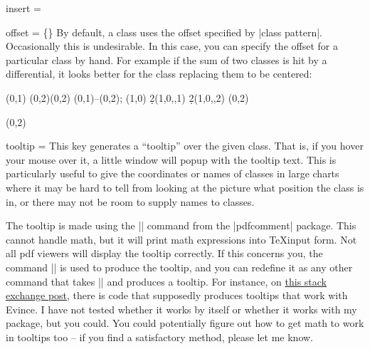 \begin{sseqdata}[|| name = ex1, cohomological Serre grading]
\begin{key}{insert = }
\end{key}

\begin{key}{offset = \{\}}
By default, a class uses the offset specified by |class pattern|. Occasionally this is undesirable. In this case, you can specify the offset for a particular class by hand. For example if the sum of two classes is hit by a differential, it looks better for the class replacing them to be centered:
\begin{codeexample}[width = 9cm]
\begin{sseqdata}[ name = offset example,
    xscale = 0.7,
    Adams grading,
    class placement transform = {scale = 1.8} ]
\class(0,1)
\class(0,2)\class(0,2)
\draw(0,1)--(0,2);
\class(1,0)
\d2(1,0,,1)
\d2(1,0,,2)
\replaceclass(0,2)
\end{sseqdata}
\printpage[name = offset example, page=2]
\printpage[name = offset example, page=3]
\begin{sseqpage}[name = offset example, page=3]
\classoptions[offset = {(0,0)}](0,2)
\end{sseqpage}
\end{codeexample}
\end{key}

\begin{key}{tooltip = }
This key generates a ``tooltip'' over the given class. That is, if you hover your mouse over it, a little window will popup with the tooltip text. This is particularly useful to give the coordinates or names of classes in large charts where it may be hard to tell from looking at the picture what position the class is in, or there may not be room to supply names to classes.

The tooltip is made using the |\pdftooltip| command from the |pdfcomment| package. This cannot handle math, but it will print math expressions into \TeX input form. Not all pdf viewers will display the tooltip correctly. If this concerns you, the command |\sseqtooltip| is used to produce the tooltip, and you can redefine it as any other command that takes |\sseqtooltip| and produces a tooltip. For instance, on \href{https://tex.stackexchange.com/a/164186/23866}{this stack exchange post}, there is code that supposedly produces tooltips that work with Evince. I have not tested whether it works by itself or whether it works with my package, but you could. You could potentially figure out how to get math to work in tooltips too -- if you find a satisfactory method, please let me know.


\end{key}
\end{sseqdata}
